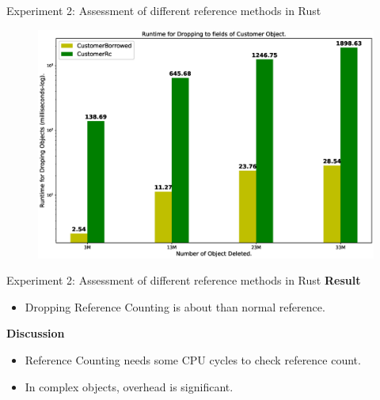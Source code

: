 \documentclass[9pt]{beamer}
\begin{document}


\begin{frame}[fragile]{Experiment 2: Assessment of different reference methods in Rust}

    \begin{figure}[hp]
        \centering
        \begin{center}
                \includegraphics[width=1\textwidth]{images/rust_droptime_borring_rc.eps}
                \captionsetup{labelformat=empty}
        \end{center}
    \end{figure}
\end{frame}

\begin{frame}[fragile]{Experiment 2: Assessment of different reference methods in Rust}
    \textbf{Result}
    \begin{itemize}
        \item Dropping Reference Counting is about  than normal reference.
    \end{itemize}

    \vspace{0.5cm}

    \textbf{Discussion}
    \begin{itemize}
        \item Reference Counting needs some CPU cycles to check reference count.
        \item In complex objects, overhead is significant.
    \end{itemize}
\end{frame}
\end{document}
